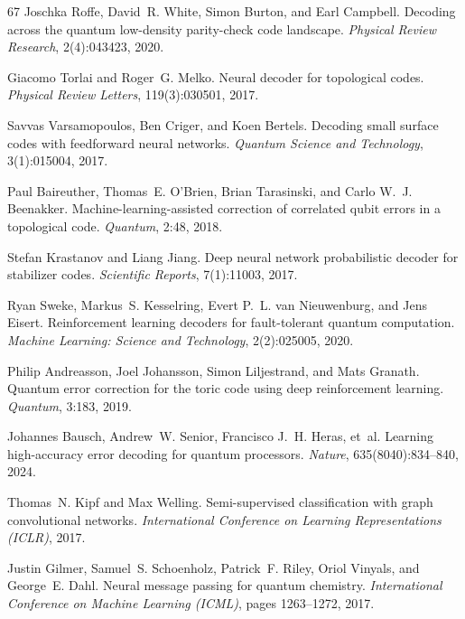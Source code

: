 \documentclass[aps,prxquantum,twocolumn,superscriptaddress,nofootinbib,longbibliography]{revtex4-2}
\begin{document}
\begin{thebibliography}{67}
Joschka Roffe, David~R. White, Simon Burton, and Earl Campbell. Decoding across
the quantum low-density parity-check code landscape. \emph{Physical Review
Research}, 2(4):043423, 2020.

Giacomo Torlai and Roger~G. Melko. Neural decoder for topological codes.
\emph{Physical Review Letters}, 119(3):030501, 2017.

Savvas Varsamopoulos, Ben Criger, and Koen Bertels. Decoding small surface codes
with feedforward neural networks. \emph{Quantum Science and Technology},
3(1):015004, 2017.

Paul Baireuther, Thomas~E. O'Brien, Brian Tarasinski, and Carlo W.~J. Beenakker.
Machine-learning-assisted correction of correlated qubit errors in a topological
code. \emph{Quantum}, 2:48, 2018.

Stefan Krastanov and Liang Jiang. Deep neural network probabilistic decoder for
stabilizer codes. \emph{Scientific Reports}, 7(1):11003, 2017.

Ryan Sweke, Markus~S. Kesselring, Evert P.~L. van Nieuwenburg, and Jens Eisert.
Reinforcement learning decoders for fault-tolerant quantum computation.
\emph{Machine Learning: Science and Technology}, 2(2):025005, 2020.

Philip Andreasson, Joel Johansson, Simon Liljestrand, and Mats Granath. Quantum
error correction for the toric code using deep reinforcement learning.
\emph{Quantum}, 3:183, 2019.

Johannes Bausch, Andrew~W. Senior, Francisco J.~H. Heras, et~al. Learning
high-accuracy error decoding for quantum processors. \emph{Nature},
635(8040):834--840, 2024.

Thomas~N. Kipf and Max Welling. Semi-supervised classification with graph
convolutional networks. \emph{International Conference on Learning
Representations (ICLR)}, 2017.

Justin Gilmer, Samuel~S. Schoenholz, Patrick~F. Riley, Oriol Vinyals, and
George~E. Dahl. Neural message passing for quantum chemistry. \emph{International
Conference on Machine Learning (ICML)}, pages 1263--1272, 2017.


\end{thebibliography}
\end{document}
